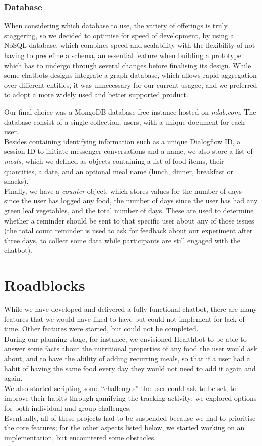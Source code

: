 \subsubsection{Database}
When considering which database to use, the variety of offerings is truly staggering, so we decided to optimise for speed of development, by using a NoSQL database, which combines speed and scalability with the flexibility of not having to predefine a schema, an essential feature when building a prototype which has to undergo through several changes before finalising its design. While some chatbots designs integrate a graph database, which allows rapid aggregation over different entities, it was unnecessary for our current usagee, and we preferred to adopt a more widely used and better supported product.

Our final choice was a MongoDB database free instance hosted on \textit{mlab.com}. The database consist of a single collection, users, with a unique document for each user. \\
Besides containing identifying information such as a unique Dialogflow ID, a session ID to initiate messenger conversations and a name, we also store a list of \textit{meals}, which we defined as objects containing a list of food items, their quantities, a date, and an optional meal name (lunch, dinner, breakfast or snacks). \\
Finally, we have a \textit{counter} object, which stores values for the number of days since the user has logged any food, the number of days since the user has had any green leaf vegetables, and the total number of days. These are used to determine whether a reminder should be sent to that specific user about any of those issues (the total count reminder is used to ask for feedback about our experiment after three days, to collect some data while participants are still engaged with the chatbot).
\section{Roadblocks}
While we have developed and delivered a fully functional chatbot, there are many features that we would have liked to have but could not implement for lack of time. Other features were started, but could not be completed. \\
During our planning stage, for instance, we envisioned Healthbot to be able to answer some facts about the nutritional properties of any food the user would ask about, and to have the ability of adding recurring meals, so that if a user had a habit of having the same food every day they would not need to add it again and again. \\
We also started scripting some ``challenges'' the user could ask to be set, to improve their habits through gamifying the tracking activity; we explored options for both individual and group challenges.\\
Eventually, all of these projects had to be suspended because we had to prioritise the core features; for the other aspects listed below, we started working on an implementation, but encountered some obstacles.
